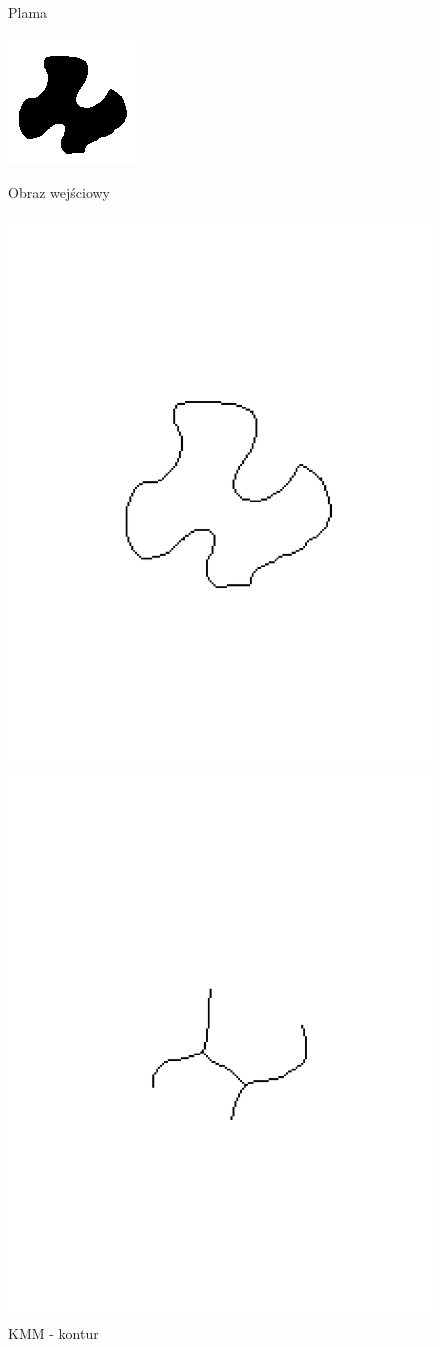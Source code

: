 \documentclass[11pt]{article}
\begin{document}
\begin{figure}[!ht] 
  \caption{Plama}
  \label{ fig7} 
  \begin{minipage}[b]{0.5\linewidth}
    \centering
    \includegraphics[width=.5\linewidth]{../images/blob} 
    \caption{Obraz wejściowy} 
    \vspace{4ex}
  \end{minipage}%
  \begin{minipage}[b]{0.5\linewidth}
    \centering
    \includegraphics[width=.5\linewidth]{../samples/blob_kmm_contour} 
    \caption{KMM - kontur} 
    \vspace{4ex}
  \end{minipage} 
  \begin{minipage}[b]{0.5\linewidth}
    \centering
    \includegraphics[width=.5\linewidth]{../samples/blob_kmm} 

\end{minipage}
\end{figure}
\end{document}
